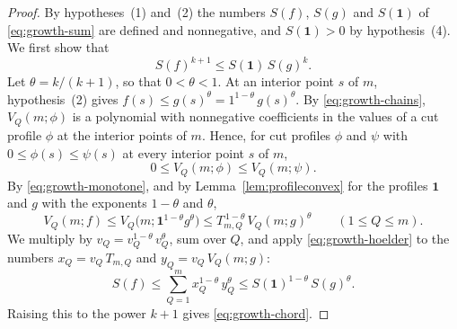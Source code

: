 \documentclass{amsart}
\theoremstyle{definition}
\theoremstyle{remark}
\numberwithin{equation}{section}
\begin{document}
\begin{proof}
By hypotheses~(1) and~(2) the numbers $S(f)$, $S(g)$ and $S(\mathbf 1)$ of
\eqref{eq:growth-sum} are defined and nonnegative, and $S(\mathbf 1)>0$ by
hypothesis~(4). We first show that
\begin{equation}\label{eq:growth-chord}
S(f)^{k+1}\le S(\mathbf 1)\,S(g)^{k}.
\end{equation}
Let $\theta=k/(k+1)$, so that $0<\theta<1$. At an interior point $s$ of
$m$, hypothesis~(2) gives $f(s)\le g(s)^{\theta}=1^{1-\theta}\,g(s)^{\theta}$.
By \eqref{eq:growth-chains}, $V_Q(m;\phi)$ is a polynomial with
nonnegative coefficients in the values of a cut profile $\phi$ at the
interior points of $m$. Hence, for cut profiles $\phi$ and $\psi$ with
$0\le\phi(s)\le\psi(s)$ at every interior point $s$ of $m$,
\begin{equation}\label{eq:growth-monotone}
0\le V_Q(m;\phi)\le V_Q(m;\psi).
\end{equation}
By
\eqref{eq:growth-monotone}, and by Lemma~\ref{lem:profileconvex} for the
profiles $\mathbf 1$ and $g$ with the exponents $1-\theta$ and $\theta$,
\[
V_Q(m;f)\le V_Q\bigl(m;\mathbf 1^{1-\theta}g^{\theta}\bigr)
\le T_{m,Q}^{\,1-\theta}\,V_Q(m;g)^{\theta}\qquad(1\le Q\le m).
\]
We multiply by $v_Q=v_Q^{1-\theta}\,v_Q^{\theta}$, sum over $Q$, and apply
\eqref{eq:growth-hoelder} to the numbers $x_Q=v_Q\,T_{m,Q}$ and
$y_Q=v_Q\,V_Q(m;g)$:
\[
S(f)\le\sum_{Q=1}^{m}x_Q^{1-\theta}\,y_Q^{\theta}
\le S(\mathbf 1)^{1-\theta}\,S(g)^{\theta}.
\]
Raising this to the power $k+1$ gives \eqref{eq:growth-chord}.


\end{proof}
\end{document}
